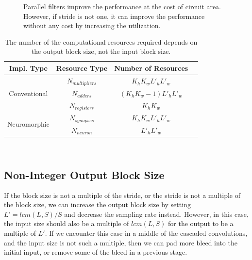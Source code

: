 \documentclass[journal]{IEEEtran}
\begin{document}
  \begin{figure}
  \centering
  \begin{subfigure}{.22\textwidth}
    \centering
    \caption{}
  \end{subfigure}
  \begin{subfigure}{.22\textwidth} 
    \centering
    \caption{}
  \end{subfigure}
  \begin{subfigure}{.22\textwidth}
    \centering
    \caption{}
  \end{subfigure}
  \begin{subfigure}{.22\textwidth}
    \centering
    \caption{}
  \end{subfigure}
  \caption{Parallel filters improve the performance at the cost of circuit area. However, if stride is not one, it can improve the performance without any cost by increasing the utilization.  }\label{fdata}
  \end{figure}
\begin{table}\small
	 \centering 
\caption{The number of the computational resources required depends on the output block size, not the input block size. }\label{resource}
\begin{tabular}{|c|c|c|c|}
\hline
Impl. Type   & Resource Type & Number of Resources   \\
   \hline
 
 & $N_{multipliers}$ & $K_h  K_w  L'_h  L'_w$\\
Conventional & $N_{adders}$ & $(K_h  K_w - 1 ) L'_h  L'_w$ \\
 & $N_{registers}$  & $K_h K_w$  \\
\hline
\multirow{2}{*}{Neuromorphic} & $N_{synapses}$ & $K_h  K_w  L'_h  L'_w$    \\
 & $N_{neuron}$  &   $L'_hL'_w $   \\ 
\hline
\end{tabular}\\\raggedright
\end{table}	

\subsection{Non-Integer Output Block Size}
If the block size is not a multiple of the stride, or the stride is not a multiple of the block size, we can increase the output block size by setting $L'=lcm(L, S)/S$ and decrease the sampling rate instead. However, in this case, the input size should also be a multiple of $lcm(L,S)$ for the output to be a multiple of $L'$.
If we encounter this case in a middle of the cascaded convolutions, and the input size is not such a multiple, then we can pad more bleed into the initial input, or remove some of the bleed in a previous stage. 
\end{document}
